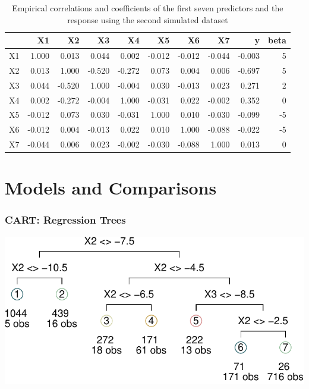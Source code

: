 \documentclass[12pt,twoside]{reedthesis}
\let\origfigure\figure
\let\endorigfigure\endfigure
\renewenvironment{figure}[1][2] {
    \expandafter\origfigure\expandafter[H]
} {
    \endorigfigure
}
\begin{document}
  \begin{table}
  
  \caption{\label{tab:unnamed-chunk-17}\label{tab:tabcorSim2}Empirical correlations and coefficients of the first seven predictors and the response using the second simulated dataset}
  \centering
  \begin{tabular}[t]{l|r|r|r|r|r|r|r|r|r}
  \hline
    & X1 & X2 & X3 & X4 & X5 & X6 & X7 & y & beta\\
  \hline
  X1 & 1.000 & 0.013 & 0.044 & 0.002 & -0.012 & -0.012 & -0.044 & -0.003 & 5\\
  \hline
  X2 & 0.013 & 1.000 & -0.520 & -0.272 & 0.073 & 0.004 & 0.006 & -0.697 & 5\\
  \hline
  X3 & 0.044 & -0.520 & 1.000 & -0.004 & 0.030 & -0.013 & 0.023 & 0.271 & 2\\
  \hline
  X4 & 0.002 & -0.272 & -0.004 & 1.000 & -0.031 & 0.022 & -0.002 & 0.352 & 0\\
  \hline
  X5 & -0.012 & 0.073 & 0.030 & -0.031 & 1.000 & 0.010 & -0.030 & -0.099 & -5\\
  \hline
  X6 & -0.012 & 0.004 & -0.013 & 0.022 & 0.010 & 1.000 & -0.088 & -0.022 & -5\\
  \hline
  X7 & -0.044 & 0.006 & 0.023 & -0.002 & -0.030 & -0.088 & 1.000 & 0.013 & 0\\
  \hline
  \end{tabular}
  \end{table}
  
  \section{Models and Comparisons}\label{models-and-comparisons}
  
  \subsubsection{CART: Regression Trees}\label{cart-regression-trees}
  
  \begin{figure}[htbp]
  \centering
  \includegraphics{Thesis_files/figure-latex/unnamed-chunk-19-1.pdf}
  \caption{\label{fig:unnamed-chunk-19}\label{fig:figcarts}CART representing
  Y\textasciitilde{} X, from D2}
  \end{figure}
  
\end{document}

